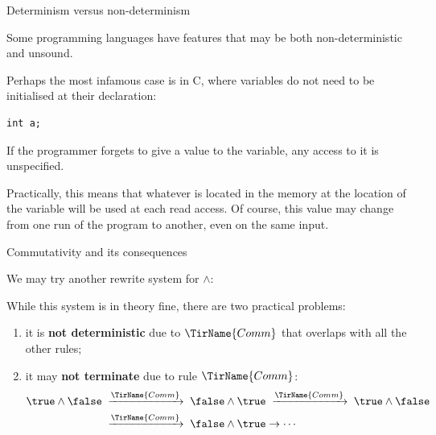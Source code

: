 %
\begin{frame}[fragile]{Determinism versus non-determinism}

  Some programming languages have features that may be both
  non\hyp{}deterministic and unsound.

  \bigskip

  Perhaps the most infamous case is in C, where variables do not need
  to be initialised at their declaration:
{\footnotesize
\begin{verbatim}
int a;
\end{verbatim}
}
  If the programmer forgets to give a value to the variable, any access
  to it is unspecified.

  \bigskip

  Practically, this means that whatever is located in the memory at
  the location of the variable will be used at each read access. Of
  course, this value may change from one run of the program to
  another, even on the same input.

\end{frame}

%
\begin{frame}{Commutativity and its consequences}

  We may try another rewrite system for \(\wedge\):
  While this system is in theory fine, there are two practical
  problems:
  \begin{enumerate}

    \item it is \textbf{not deterministic} due to \(\TirName{Comm}\)
      that overlaps with all the other rules;

    \item it may \textbf{not terminate} due to rule
      \(\TirName{Comm}\):
      \begin{align*}
        \true \wedge \false
        & \;\xrightarrow{\TirName{Comm}}\;
        \false \wedge \true \;\xrightarrow{\TirName{Comm}}\; \true
        \wedge \false\\
        & \;\xrightarrow{\TirName{Comm}}\; \false
        \wedge \true \rightarrow \cdots
      \end{align*}

  \end{enumerate}

\end{frame}

